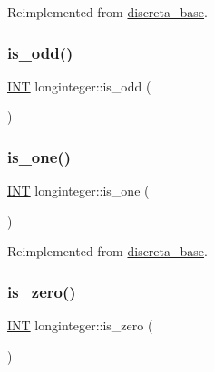 Reimplemented from \mbox{\hyperlink{classdiscreta__base_afc2e134e55759cf069f49fcf05af418b}{discreta\+\_\+base}}.

\mbox{\label{classlonginteger_a5110768d8c2cfc82037d6d3ae4ead236}} 
\subsubsection{\texorpdfstring{is\+\_\+odd()}{is\_odd()}}
{\footnotesize\ttfamily \mbox{\hyperlink{galois_8h_a09fddde158a3a20bd2dcadb609de11dc}{I\+NT}} longinteger\+::is\+\_\+odd (\begin{DoxyParamCaption}{ }\end{DoxyParamCaption})}

\mbox{\label{classlonginteger_a2e169e4ac876ac8694af28468fdfd060}} 
\subsubsection{\texorpdfstring{is\+\_\+one()}{is\_one()}}
{\footnotesize\ttfamily \mbox{\hyperlink{galois_8h_a09fddde158a3a20bd2dcadb609de11dc}{I\+NT}} longinteger\+::is\+\_\+one (\begin{DoxyParamCaption}{ }\end{DoxyParamCaption})\hspace{0.3cm}{\ttfamily [virtual]}}



Reimplemented from \mbox{\hyperlink{classdiscreta__base_a28fa37aac83194174888d34f07f43848}{discreta\+\_\+base}}.

\mbox{\label{classlonginteger_aa40fbd6c28e40a7a19cb29b8999afbc0}} 
\subsubsection{\texorpdfstring{is\+\_\+zero()}{is\_zero()}}
{\footnotesize\ttfamily \mbox{\hyperlink{galois_8h_a09fddde158a3a20bd2dcadb609de11dc}{I\+NT}} longinteger\+::is\+\_\+zero (\begin{DoxyParamCaption}{ }\end{DoxyParamCaption})\hspace{0.3cm}{\ttfamily [virtual]}}



